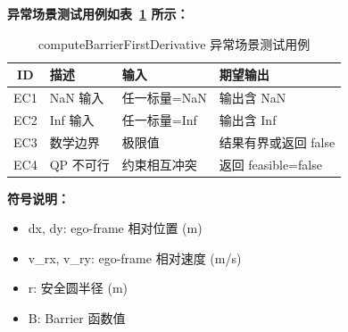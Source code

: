 \documentclass[a4paper,10pt]{article}
\begin{document}
\noindent\textbf{异常场景测试用例如表~\ref{tab:abnormal_computeBarrierFirstDerivative} 所示：}
\begin{table}[h]
\centering
\caption{computeBarrierFirstDerivative 异常场景测试用例}
\label{tab:abnormal_computeBarrierFirstDerivative}
\begin{tabular}{|c|p{3.5cm}|p{3.5cm}|p{3.5cm}|}
\hline
ID & 描述 & 输入 & 期望输出 \\ \hline
  EC1 & NaN 输入 & 任一标量=NaN & 输出含 NaN \\ \hline
  EC2 & Inf 输入 & 任一标量=Inf & 输出含 Inf \\ \hline
  EC3 & 数学边界 & 极限值 & 结果有界或返回 false \\ \hline
  EC4 & QP 不可行 & 约束相互冲突 & 返回 feasible=false \\ \hline
\end{tabular}
\end{table}

\noindent\textbf{符号说明：}
\begin{itemize}
  \item dx, dy: ego-frame 相对位置 (m)
  \item v\_rx, v\_ry: ego-frame 相对速度 (m/s)
  \item r: 安全圆半径 (m)
  \item B: Barrier 函数值
\end{itemize}
\end{document}
